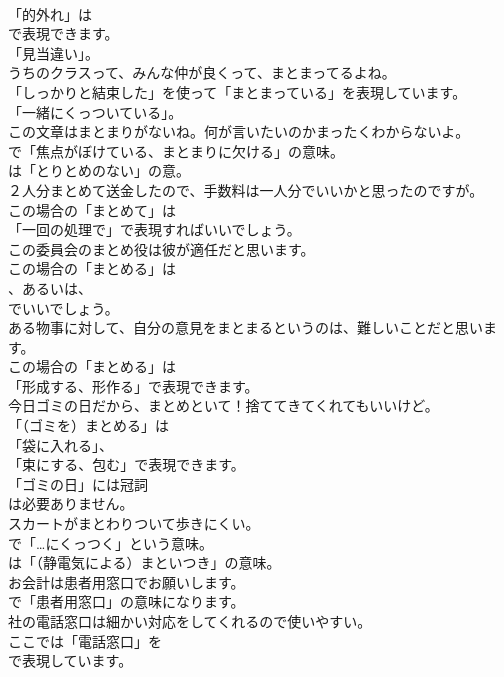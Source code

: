 \documentclass[8pt]{extreport}
\begin{document}
\begin{CJK}{UTF8}{min}
\\	「的外れ」は
\\	で表現できます。
\\	「見当違い」。	
\\	うちのクラスって、みんな仲が良くって、まとまってるよね。 
\\	「しっかりと結束した」を使って「まとまっている」を表現しています。
\\	「一緒にくっついている」。	
\\	この文章はまとまりがないね。何が言いたいのかまったくわからないよ。 
\\	で「焦点がぼけている、まとまりに欠ける」の意味。
\\	は「とりとめのない」の意。	
\\	２人分まとめて送金したので、手数料は一人分でいいかと思ったのですが。 
\\	この場合の「まとめて」は
\\	「一回の処理で」で表現すればいいでしょう。	
\\	この委員会のまとめ役は彼が適任だと思います。 
\\	この場合の「まとめる」は
\\	、あるいは、
\\	でいいでしょう。	
\\	ある物事に対して、自分の意見をまとまるというのは、難しいことだと思います。 
\\	この場合の「まとめる」は
\\	「形成する、形作る」で表現できます。	
\\	今日ゴミの日だから、まとめといて！捨ててきてくれてもいいけど。 
\\	「（ゴミを）まとめる」は
\\	「袋に入れる」、
\\	「束にする、包む」で表現できます。
\\	「ゴミの日」には冠詞
\\	は必要ありません。	
\\	スカートがまとわりついて歩きにくい。 
\\	で「…にくっつく」という意味。
\\	は「（静電気による）まといつき」の意味。	
\\	お会計は患者用窓口でお願いします。 
\\	で「患者用窓口」の意味になります。	
\\	社の電話窓口は細かい対応をしてくれるので使いやすい。 
\\	ここでは「電話窓口」を 
\\	で表現しています。

\end{CJK}
\end{document}
